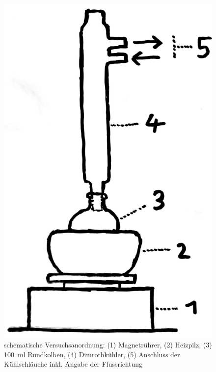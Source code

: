 \documentclass{article}
\begin{document}
        \begin{figure}[h]
          \includegraphics[scale=0.3, center]{Graphiken/Versuchsanordnungen/VersuchsanordnungSynthese.png} 
          \caption[schematische Versuchsanordnung Estersynthese, Quelle: Autor]{schematische Versuchsanordnung: (1) Magnetrührer, (2) Heizpilz, (3) \SI[mode=text]{100}{\milli\litre} Rundkolben, (4) Dimrothkühler, (5) Anschluss der Kühlschläuche inkl. Angabe der Flussrichtung}
          \label{fig:Versuchsanordnung}
        \end{figure}
        
\end{document}
